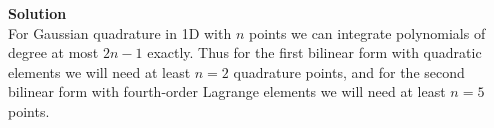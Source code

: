 \documentclass[11pt]{article}
\begin{document}
\begin{enumerate}
\begin{enumerate}
{\bf Solution}\\
For Gaussian quadrature in 1D with $n$ points we can integrate polynomials of degree at most $2n-1$ exactly.  Thus for the first bilinear form with quadratic elements we will need at least $n = 2$ quadrature points, and for the second bilinear form with fourth-order Lagrange elements we will need at least $n = 5$ points.


  \end{enumerate}

\end{enumerate}
\end{document}
